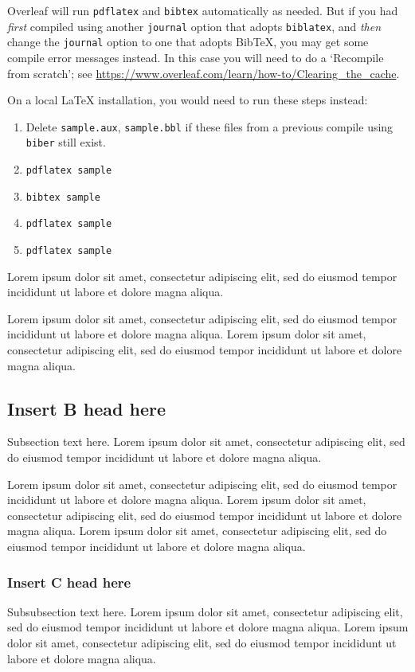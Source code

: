 \documentclass[
  journal=largetwo,
  manuscript=article-type,
  year=2020,
  volume=37,
]{cup-journal}
\begin{document}
Overleaf will run \texttt{pdflatex} and \texttt{bibtex} automatically as needed. But if you had \emph{first} compiled using another \texttt{journal} option that adopts \texttt{biblatex}, and \emph{then} change the \texttt{journal} option to one that adopts Bib\TeX{}, you may get some compile error messages instead. In this case you will need to do a `Recompile from scratch'; see \url{https://www.overleaf.com/learn/how-to/Clearing_the_cache}.

On a local \LaTeX{} installation, you would need to run these steps instead:
\begin{enumerate}
    \item Delete \texttt{sample.aux}, \texttt{sample.bbl} if these files from a previous compile using \texttt{biber} still exist.
    \item \verb|pdflatex sample|
    \item \verb|bibtex sample|
    \item \verb|pdflatex sample|
    \item \verb|pdflatex sample|
\end{enumerate}

Lorem ipsum dolor sit amet, consectetur adipiscing elit, sed do eiusmod tempor incididunt ut labore et dolore magna aliqua. 

Lorem ipsum dolor sit amet, consectetur adipiscing elit, sed do eiusmod tempor incididunt ut labore et dolore magna aliqua. Lorem ipsum dolor sit amet, consectetur adipiscing elit, sed do eiusmod tempor incididunt ut labore et dolore magna aliqua. 


\subsection{Insert B head here}
Subsection text here. Lorem ipsum\autocite{Bayer_etal_2013} dolor sit amet, consectetur adipiscing elit, sed do eiusmod tempor incididunt ut labore\autocite{Adade_etal_2007} et dolore magna aliqua. 

 Lorem ipsum dolor sit amet, consectetur adipiscing elit, sed do eiusmod tempor incididunt ut labore et dolore magna aliqua. Lorem ipsum dolor sit amet, consectetur adipiscing elit, sed do eiusmod tempor incididunt ut labore et dolore magna aliqua. Lorem ipsum dolor sit amet, consectetur adipiscing elit, sed do eiusmod tempor incididunt ut labore et dolore magna aliqua. 

\subsubsection{Insert C head here}
Subsubsection text here. Lorem ipsum dolor sit amet, consectetur adipiscing elit, sed do eiusmod tempor incididunt ut labore et dolore magna aliqua. 
Lorem ipsum dolor sit amet, consectetur adipiscing elit, sed do eiusmod tempor incididunt ut labore et dolore magna aliqua. 
\end{document}
